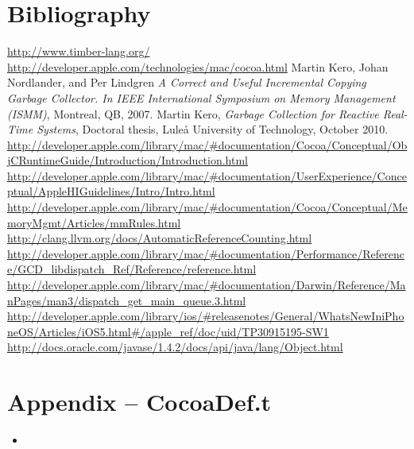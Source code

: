 \documentclass[a4paper]{article}
\newcommand{\timbercode}[2]
  {\begin{itemize}\item[]\end{itemize}}
\begin{document}
\renewcommand*{\refname}{}
\section{Bibliography} 
\begin{thebibliography}{9}
 \url{http://www.timber-lang.org/}
 \url{http://developer.apple.com/technologies/mac/cocoa.html}
 Martin Kero, Johan Nordlander, and Per Lindgren \emph{A Correct and Useful Incremental Copying Garbage Collector. In IEEE International Symposium on Memory Management (ISMM)}, Montreal, QB,  2007.
 Martin Kero, \emph{Garbage Collection for Reactive Real-Time Systems}, Doctoral thesis, Lule{\aa} University of Technology, October 2010.
 \url{http://developer.apple.com/library/mac/#documentation/Cocoa/Conceptual/ObjCRuntimeGuide/Introduction/Introduction.html}
 \url{http://developer.apple.com/library/mac/#documentation/UserExperience/Conceptual/AppleHIGuidelines/Intro/Intro.html}
 \url{http://developer.apple.com/library/mac/#documentation/Cocoa/Conceptual/MemoryMgmt/Articles/mmRules.html}
 \url{http://clang.llvm.org/docs/AutomaticReferenceCounting.html}
 \url{http://developer.apple.com/library/mac/#documentation/Performance/Reference/GCD_libdispatch_Ref/Reference/reference.html}
\url{http://developer.apple.com/library/mac/#documentation/Darwin/Reference/ManPages/man3/dispatch_get_main_queue.3.html}
 \url{http://developer.apple.com/library/ios/#releasenotes/General/WhatsNewIniPhoneOS/Articles/iOS5.html#/apple_ref/doc/uid/TP30915195-SW1}
\url{http://docs.oracle.com/javase/1.4.2/docs/api/java/lang/Object.html}
\end{thebibliography}

\newpage
\section{Appendix -- CocoaDef.t}
\timbercode{cocoaDef}{}
\end{document}
